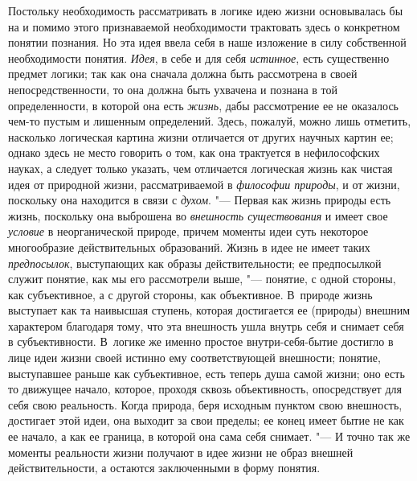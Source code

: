 Постольку необходимость рассматривать в логике идею жизни
основывалась бы на и помимо этого признаваемой необходимости трактовать
здесь о конкретном понятии познания. Но эта идея ввела себя в наше
изложение в силу собственной необходимости понятия.
{\em Идея}, в себе и для
себя {\em истинное}, есть
существенно предмет логики; так как она сначала должна быть рассмотрена в
своей непосредственности, то она должна быть ухвачена и познана в той
определенности, в которой она есть
{\em жизнь}, дабы
рассмотрение ее не оказалось чем-то пустым и лишенным определений. Здесь,
пожалуй, можно лишь отметить, насколько логическая картина жизни отличается
от других научных картин ее; однако здесь не место говорить о том, как она
трактуется в нефилософских науках, а следует только указать, чем отличается
логическая жизнь как чистая идея от природной жизни, рассматриваемой в
{\em философии природы},
и от жизни, поскольку она находится в связи с
{\em духом}. "--- Первая как
жизнь природы есть жизнь, поскольку она выброшена во
{\em внешность существования}
и имеет свое
{\em условие} в
неорганической природе, причем моменты идеи суть некоторое многообразие
действительных образований. Жизнь в идее не имеет таких
{\em предпосылок},
выступающих как образы действительности; ее предпосылкой
служит понятие, как мы его рассмотрели выше, "--- понятие, с
одной стороны, как субъективное, а с другой стороны, как объективное.
В~природе жизнь выступает как та наивысшая ступень, которая достигается ее
(природы) внешним характером благодаря тому, что эта внешность ушла внутрь
себя и снимает себя в субъективности. В~логике же именно простое
внутри-себя-бытие достигло в лице идеи жизни своей истинно ему
соответствующей внешности; понятие, выступавшее раньше как субъективное,
есть теперь душа самой жизни; оно есть то движущее начало, которое, проходя
сквозь объективность, опосредствует для себя свою реальность. Когда
природа, беря исходным пунктом свою внешность, достигает этой идеи, она
выходит за свои пределы; ее конец имеет бытие не как ее начало, а как ее
граница, в которой она сама себя снимает. "--- И точно так же
моменты реальности жизни получают в идее жизни не образ
внешней действительности, а остаются заключенными в форму понятия.

